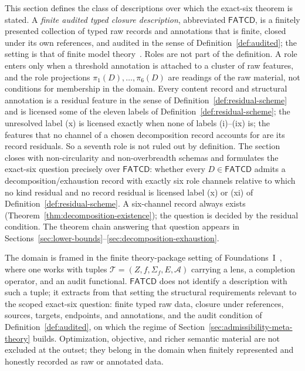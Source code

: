 \documentclass[11pt]{article}
\theoremstyle{definition}
\newcommand{\FATCD}{\ensuremath{\mathsf{FATCD}}}
\begin{document}
This section defines the class of descriptions over which the
exact-six theorem is stated. A \emph{finite audited typed closure
description}, abbreviated \FATCD{}, is a finitely presented collection
of typed raw records and annotations that is finite, closed under its
own references, and audited in the sense of Definition~\ref{def:audited}; the setting is that of finite
model theory~\citep{Libkin2004}. Roles are not part of the definition.
A role enters only when a threshold annotation is attached to a cluster
of raw features, and the role projections \(\pi_1(D),\dots,\pi_6(D)\)
are readings of the raw material, not conditions for membership in the
domain. Every content record and structural annotation is a
residual feature in the sense of Definition~\ref{def:residual-scheme} and
is licensed some of the eleven labels of Definition~\ref{def:residual-scheme}; the unresolved label (x) is licensed exactly when none of labels (i)--(ix) is; the features
that no channel of a chosen decomposition record accounts for are its record
residuals. So a seventh role is not ruled out by definition. The section closes with
non-circularity and non-overbreadth schemas and formulates the
exact-six question precisely over \FATCD{}: whether every
\(D \in \FATCD{}\) admits a decomposition/exhaustion record with
exactly six role channels relative to which no kind residual and no record residual is licensed
label (x) or (xi) of Definition~\ref{def:residual-scheme}. A six-channel record
always exists (Theorem~\ref{thm:decomposition-existence}); the question is
decided by the residual condition. The theorem chain answering that question
appears in
Sections~\ref{sec:lower-bounds}--\ref{sec:decomposition-exhaustion}.

The domain is framed in the finite theory-package setting of
Foundations~I~\citep{Tsiokos2026SixBirdsFoundations}, where one works
with tuples \(\mathcal{T} = (Z, f, \Sigma_f, E, \mathcal{A})\)
carrying a lens, a completion operator, and an audit functional. \FATCD{} does not
identify a description with such a tuple; it extracts from that
setting the structural requirements relevant to the scoped exact-six
question: finite typed raw data, closure under references, sources,
targets, endpoints, and annotations, and the audit condition of
Definition~\ref{def:audited}, on which the regime of
Section~\ref{sec:admissibility-meta-theory} builds. Optimization,
objective, and richer semantic material are not excluded at the
outset; they belong in the domain when finitely represented and
honestly recorded as raw or annotated data.
\end{document}
